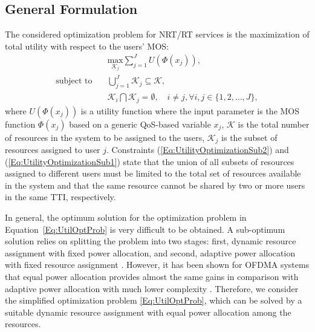 \documentclass[conference]{IEEEtran}
\newcommand{\EqRef}[1]{Equation~\ref{#1}}
\begin{document}
\subsection{General Formulation}
\label{Sec:GeneralForm}

The considered optimization problem for \ac{NRT}/\ac{RT} services is the maximization of total utility with respect to the users' MOS:
\begin{subequations}\label{Eq:UtilOptProb}
	\begin{align}
	&\underset{\mathcal{K}_j}{\text{max}} \sum_{j=1}^{J} U\left(\Phi(x_j)\right), \label{Eq:UtilityOptimization}\\
	\text{subject to} \quad 
	&\bigcup_{j=1}^{J} \mathcal{K}_j \subseteq \mathcal{K}, \label{Eq:UtilityOptimizationSub1}\\ 
	&\mathcal{K}_{i} \bigcap \mathcal{K}_j = \emptyset, \quad i \neq j,  \forall i,j \in \{1,2, \ldots, J\},\label{Eq:UtilityOptimizationSub2}
	\end{align}
\end{subequations}
%
where $U(\Phi(x_j))$ is a utility function where the input parameter is the \ac{MOS} function $\Phi(x_j)$ based on a generic QoS-based variable $x_j$, $\mathcal{K}$ is the total number of resources in the system to be assigned to the users, $\mathcal{K}_j$ is the subset of resources assigned to user $j$. Constraints (\ref{Eq:UtilityOptimizationSub2}) and (\ref{Eq:UtilityOptimizationSub1}) state that the union of all subsets of resources assigned to different users must be limited to the total set of resources available in the system and that the same resource cannot be shared by two or more users in the same \ac{TTI}, respectively. 

In general, the optimum solution for the optimization problem in \EqRef{Eq:UtilOptProb} is very difficult to be obtained. A sub-optimum solution relies on splitting the problem into two stages: first, dynamic resource assignment with fixed power allocation, and second, adaptive power allocation with fixed resource assignment \cite{Gross2006}. However, it has been shown for \ac{OFDMA} systems that equal power allocation provides almost the same gains in comparison with adaptive power allocation with much lower complexity \cite{Andrews2001}. Therefore, we consider the simplified optimization problem \eqref{Eq:UtilOptProb}, which can be solved by a suitable dynamic resource assignment
with equal power allocation among the resources. 
\end{document}
